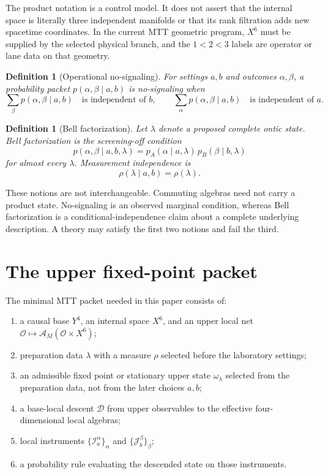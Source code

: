 \documentclass[11pt]{article}
\newcommand{\cA}{\mathcal{A}}
\newcommand{\cI}{\mathcal{I}}
\newcommand{\cJ}{\mathcal{J}}
\newcommand{\cD}{\mathcal{D}}
\newtheorem{definition}[theorem]{Definition}
\theoremstyle{remark}
\begin{document}
The product notation is a control model.  It does not assert that the internal
space is literally three independent manifolds or that its rank filtration
adds new spacetime coordinates.  In the current MTT geometric program,
$X^6$ must be supplied by the selected physical branch, and the $1<2<3$
labels are operator or lane data on that geometry.

\begin{definition}[Operational no-signaling]
For settings $a,b$ and outcomes $\alpha,\beta$, a probability packet
$p(\alpha,\beta\mid a,b)$ is no-signaling when
\[
 \sum_\beta p(\alpha,\beta\mid a,b)
 \quad\text{is independent of }b,
\qquad
 \sum_\alpha p(\alpha,\beta\mid a,b)
 \quad\text{is independent of }a.
\]
\end{definition}

\begin{definition}[Bell factorization]
Let $\lambda$ denote a proposed complete ontic state.  Bell factorization is
the screening-off condition
\[
 p(\alpha,\beta\mid a,b,\lambda)
 =
 p_A(\alpha\mid a,\lambda)\,
 p_B(\beta\mid b,\lambda)
\]
for almost every $\lambda$.  Measurement independence is
\[
 \rho(\lambda\mid a,b)=\rho(\lambda).
\]
\end{definition}

These notions are not interchangeable.  Commuting algebras need not carry a
product state.  No-signaling is an observed marginal condition, whereas Bell
factorization is a conditional-independence claim about a complete underlying
description.  A theory may satisfy the first two notions and fail the third.

\section{The upper fixed-point packet}
\label{sec:upper-packet}

The minimal MTT packet needed in this paper consists of:

\begin{enumerate}[label=(U\arabic*)]
\item a causal base $Y^4$, an internal space $X^6$, and an upper local
net $\mathcal O\mapsto\cA_M(\mathcal O\times X^6)$;
\item preparation data $\lambda$ with a measure $\rho$ selected before the
laboratory settings;
\item an admissible fixed point or stationary upper state
$\omega_\lambda$ selected from the preparation data, not from the later
choices $a,b$;
\item a base-local descent $\cD$ from upper observables to the effective
four-dimensional local algebras;
\item local instruments $\{\cI_{a}^{\alpha}\}_{\alpha}$ and
$\{\cJ_{b}^{\beta}\}_{\beta}$;
\item a probability rule evaluating the descended state on those
instruments.
\end{enumerate}
\end{document}
